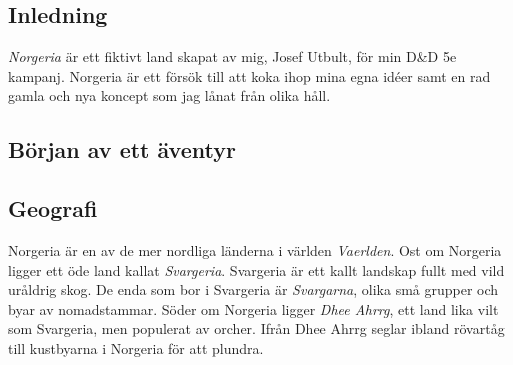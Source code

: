 \subsection{Inledning}
\textit{Norgeria} är ett fiktivt land skapat av mig, Josef Utbult, för min D\&D 5e kampanj. Norgeria är ett försök till att koka ihop mina egna idéer samt en rad gamla och nya koncept som jag lånat från olika håll. 

\subsection{Början av ett äventyr}



\subsection{Geografi}
Norgeria är en av de mer nordliga länderna i världen \textit{Vaerlden}. Ost om Norgeria ligger ett öde land kallat \textit{Svargeria}. Svargeria är ett kallt landskap fullt med vild uråldrig skog. De enda som bor i Svargeria är \textit{Svargarna}, olika små grupper och byar av nomadstammar. Söder om Norgeria ligger \textit{Dhee Ahrrg}, ett land lika vilt som Svargeria, men populerat av orcher. Ifrån Dhee Ahrrg seglar ibland rövartåg till kustbyarna i Norgeria för att plundra.
